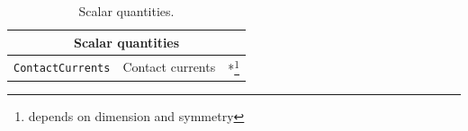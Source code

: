 \begin{table}[!htb]
\center
\begin{minipage}{8cm}
\center
\begin{tabular}{l|l|l}
\multicolumn{3}{c}{\textbf{Scalar quantities}} \\
\hline
\texttt{ContactCurrents} & Contact currents & *\footnote{depends on dimension and symmetry}\\
\end{tabular}
\end{minipage}
\caption{Scalar quantities.} \label{table:dsc_scalar}
\end{table}
